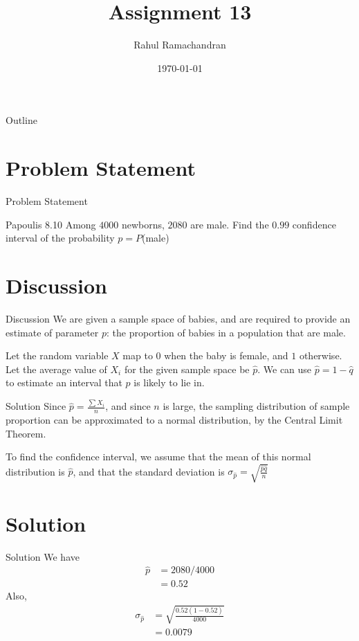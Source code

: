 \documentclass{beamer}
\title{Assignment 13}
\author{Rahul Ramachandran}
\date{\today}
\begin{document}
\begin{frame}
    \titlepage 
\end{frame}

\logo{}


\begin{frame}{Outline}
    \tableofcontents
\end{frame}



\section{Problem Statement}
\begin{frame}{Problem Statement}
    \begin{block}{Papoulis 8.10} Among $4000$ newborns, $2080$ are male. Find the $0.99$ confidence interval of the probability
$p = P$(male) \end{block}
\end{frame}

\section{Discussion}
\begin{frame}{Discussion}
 We are given a sample space of babies, and are required to provide an estimate of parameter $p$: the proportion of babies in a population that are male.
 
 Let the random variable $X$ map to 0 when the baby is female, and $1$ otherwise. Let the average value of $X_i$ for the given sample space be $\hat{p}$. We can use $\hat{p} = 1 - \hat{q}$ to estimate an interval that $p$ is likely to lie in.

\end{frame}




\begin{frame}{Solution}
 Since $\hat{p} = \frac{\sum X_i}{n}$, and since $n$ is large, the sampling distribution of sample proportion can be approximated to a normal distribution, by the Central Limit Theorem.
 
 To find the confidence interval, we assume that the mean of this normal distribution is $\hat{p}$, and that the standard deviation is $\sigma_{\hat{p}} = \sqrt{\frac{\hat{p} \hat{q}}{n}}$
\end{frame}

\section{Solution}
\begin{frame}{Solution}
We have
\begin{align}
    \hat{p} &= 2080/4000 \\
            &= 0.52
 \end{align}
 Also,
     \begin{align}
    \sigma_{\hat{p}} &= \sqrt{\frac{0.52(1-0.52)}{4000}} \\
    &= 0.0079
 \end{align}


\end{frame}
\end{document}
